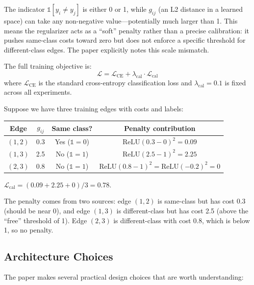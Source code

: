 \documentclass[11pt,a4paper]{article}
\theoremstyle{definition}
\theoremstyle{plain}
\begin{document}
\begin{warning}[title=The Scale Mismatch]
The indicator $\mathbb{1}[y_i \neq y_j]$ is either 0 or 1, while $g_{ij}$
(an L2 distance in a learned space) can take any non-negative value---potentially
much larger than 1.
This means the regularizer acts as a ``soft'' penalty rather than a precise
calibration: it pushes same-class costs toward zero but does not enforce
a specific threshold for different-class edges.
The paper explicitly notes this scale mismatch.
\end{warning}

The full training objective is:
\[
  \mathcal{L} = \mathcal{L}_{\text{CE}} + \lambda_{\text{cal}} \cdot \mathcal{L}_{\text{cal}}
\]
where $\mathcal{L}_{\text{CE}}$ is the standard cross-entropy classification loss and
$\lambda_{\text{cal}} = 0.1$ is fixed across all experiments.

\begin{example}
Suppose we have three training edges with costs and labels:
\begin{center}
\begin{tabular}{cccc}
\toprule
Edge & $g_{ij}$ & Same class? & Penalty contribution \\
\midrule
$(1,2)$ & 0.3 & Yes ($\mathbb{1}=0$) & $\mathrm{ReLU}(0.3 - 0)^2 = 0.09$ \\
$(1,3)$ & 2.5 & No ($\mathbb{1}=1$) & $\mathrm{ReLU}(2.5 - 1)^2 = 2.25$ \\
$(2,3)$ & 0.8 & No ($\mathbb{1}=1$) & $\mathrm{ReLU}(0.8 - 1)^2 = \mathrm{ReLU}(-0.2)^2 = 0$ \\
\bottomrule
\end{tabular}
\end{center}

$\mathcal{L}_{\text{cal}} = (0.09 + 2.25 + 0) / 3 = 0.78$.

The penalty comes from two sources: edge $(1,2)$ is same-class but has cost 0.3
(should be near 0), and edge $(1,3)$ is different-class but has cost 2.5 (above
the ``free'' threshold of 1).
Edge $(2,3)$ is different-class with cost 0.8, which is below 1, so no penalty.
\end{example}


\subsection{Architecture Choices}
\label{sec:architecture}

The paper makes several practical design choices that are worth understanding:
\end{document}
